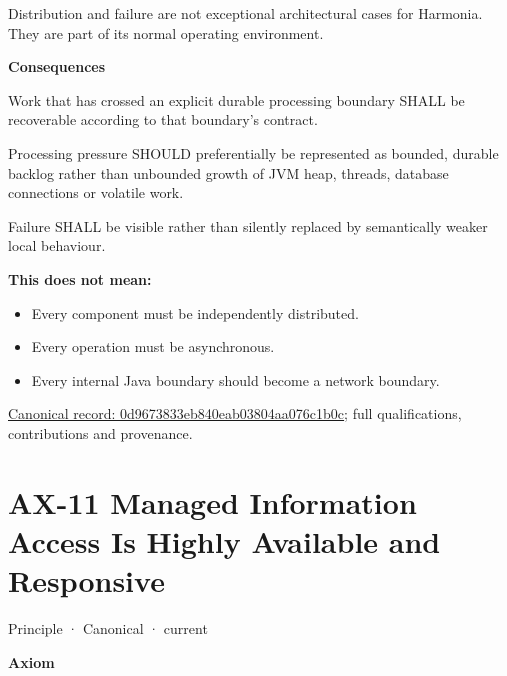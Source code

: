 Distribution and failure are not exceptional architectural cases for
Harmonia. They are part of its normal operating environment.



\par\medskip\textbf{Consequences}\par


Work that has crossed an explicit durable processing boundary SHALL be
recoverable according to that boundary's contract.



Processing pressure SHOULD preferentially be represented as bounded,
durable backlog rather than unbounded growth of JVM heap, threads,
database connections or volatile work.



Failure SHALL be visible rather than silently replaced by semantically
weaker local behaviour.



\textbf{This does not mean:}



\begin{itemize}


\item Every component must be independently distributed.

\item Every operation must be asynchronous.

\item Every internal Java boundary should become a network boundary.

\end{itemize}

{\footnotesize \href{../../../../continuum/motivation/principle/0d9673833eb840eab03804aa076c1b0c.md}{Canonical record: 0d9673833eb840eab03804aa076c1b0c}; full qualifications, contributions and provenance.}\par
\section{AX-11 Managed Information Access Is Highly Available and Responsive}

\label{element:8a1e995f16954484a78ae1c5c114d546}
{\small Principle · Canonical · current}\par

\par\medskip\textbf{Axiom}\par


